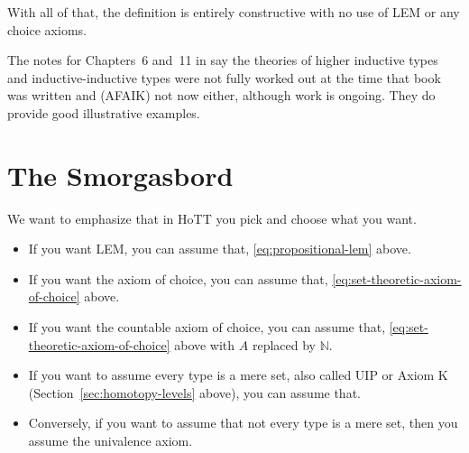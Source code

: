\documentclass[11pt]{article}
\newcommand{\nats}{\mathbb{N}}
\begin{document}
With all of that, the definition is entirely constructive
with no use of LEM or any choice axioms.

The notes for Chapters~6 and~11 {in}  say the theories
of higher inductive types and inductive-inductive types were not fully
worked out at the time that book was written and (AFAIK) not now either,
although work is ongoing.  They do provide good illustrative examples.

\section{The Smorgasbord}

We want to emphasize that in HoTT you pick and choose what you want.

\begin{itemize}
\item If you want LEM, you can assume that, \eqref{eq:propositional-lem} above.
\item If you want the axiom of choice, you can assume that,
    \eqref{eq:set-theoretic-axiom-of-choice} above.
\item If you want the countable axiom of choice, you can assume that,
    \eqref{eq:set-theoretic-axiom-of-choice} above with $A$ replaced by $\nats$.
\item If you want to assume every type is a mere set, also called UIP or
    Axiom K (Section~\ref{sec:homotopy-levels} above), you can assume that.
\item Conversely, if you want to assume that not every type is a mere set,
    then you assume the univalence axiom.
\end{itemize}
\end{document}
